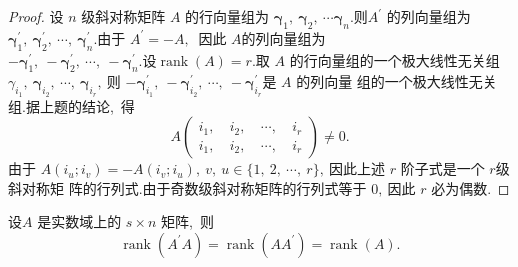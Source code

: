 \begin{proof}
	设  $n$  级斜对称矩阵  $A$  的行向量组为  $\boldsymbol{\gamma}_{1},\  \boldsymbol{\gamma}_{2},\  \cdots \boldsymbol{\gamma}_{n}.$则$  A^{\prime} $ 的列向量组为 $ \boldsymbol{\gamma}_{1}^{\prime},\  \boldsymbol{\gamma}_{2}^{\prime} ,\   \cdots,\  \boldsymbol{\gamma}_{n}^{\prime} .$由于 $ A^{\prime}=-A ,\ $ 因此  $A  $的列向量组为  $-\boldsymbol{\gamma}_{1}^{\prime},\ -\boldsymbol{\gamma}_{2}^{\prime},\  \cdots,\ -\boldsymbol{\gamma}_{n}^{\prime}  .设  \operatorname{rank}(A)=r .$取 $ A$  的行向量组的一个极大线性无关组  $\gamma_{i_{1}},\  \boldsymbol{\gamma}_{i_{2}},\  \cdots,\  \boldsymbol{\gamma}_{i_{r}} ,\  $则 $ -\boldsymbol{\gamma}_{i_{1}}^{\prime},\ -\boldsymbol{\gamma}_{i_{2}}^{\prime},\  \cdots,\ -\boldsymbol{\gamma}_{i_{r}}^{\prime}  $是 $ A $ 的列向量 组的一个极大线性无关组.据上题的结论,\  得
	$$A\left(\begin{array}{llll}
		i_{1},\  & i_{2},\  & \cdots,\  & i_{r} \\
		i_{1},\  & i_{2},\  & \cdots,\  & i_{r}
	\end{array}\right) \neq 0 .$$
	由于  $A\left(i_{u} ; i_{v}\right)=-A\left(i_{v} ; i_{u}\right),\  v,\  u \in\{1,\ 2,\  \cdots,\  r\} ,\  $因此上述  $r$  阶子式是一个 $ r  $级斜对称矩 阵的行列式.由于奇数级斜对称矩阵的行列式等于 $0 ,\  $因此  $r$  必为偶数.
\end{proof}
\newpage
\begin{problem}
	设$  A$ 是实数域上的 $ s \times n $ 矩阵,\  则
	$$\operatorname{rank}\left(A^{\prime} A\right)=\operatorname{rank}\left(A A^{\prime}\right)=\operatorname{rank}(A) .$$
\end{problem}
